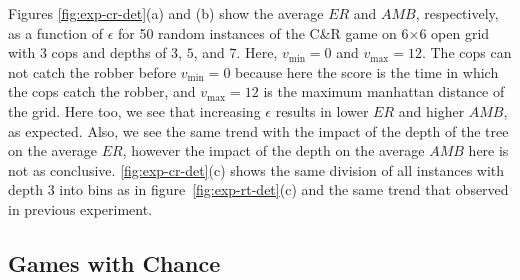 \documentclass[letterpaper]{article} %
\newcommand{\vmax}{v_{\text{max}}}
\newcommand{\vmin}{v_{\text{min}}}
\newcommand{\amb}{\textit{AMB}}
\newcommand{\er}{\textit{ER}}
\begin{document}
Figures \ref{fig:exp-cr-det}(a) and (b) show the average $\er$ and $\amb$, respectively, as a function of  $\epsilon$ for 50 random instances of the C\&R game on 6$\times$6 open grid with 3 cops and depths of $3$, $5$, and $7$. Here, $\vmin=0$ and $\vmax=12$. The cops can not catch the robber before $\vmin=0$ because here the score is the time in which the cops catch the robber, and $\vmax=12$ is the maximum manhattan distance of the grid.
Here too, we see that increasing $\epsilon$ results in lower $\er$ and higher $\amb$, as expected. Also, we see the same trend with the impact of the depth of the tree on the average $\er$, however the impact of the depth  on the average $\amb$
here is not as conclusive. \ref{fig:exp-cr-det}(c) shows the same division of all instances with depth 3 into bins as in figure~\ref{fig:exp-rt-det}(c) and the same trend that observed in previous experiment. 

\subsection{Games with Chance}

\end{document}
